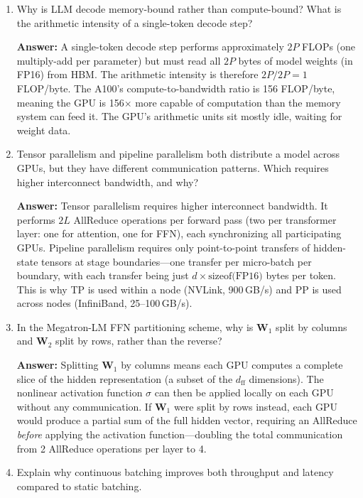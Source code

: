 \begin{enumerate}
  \item Why is LLM decode memory-bound rather than compute-bound? What is the arithmetic intensity of a single-token decode step?

  \textbf{Answer:} A single-token decode step performs approximately $2P$ FLOPs (one multiply-add per parameter) but must read all $2P$ bytes of model weights (in FP16) from HBM. The arithmetic intensity is therefore $2P / 2P = 1$ FLOP/byte. The A100's compute-to-bandwidth ratio is 156 FLOP/byte, meaning the GPU is 156$\times$ more capable of computation than the memory system can feed it. The GPU's arithmetic units sit mostly idle, waiting for weight data.

  \item Tensor parallelism and pipeline parallelism both distribute a model across GPUs, but they have different communication patterns. Which requires higher interconnect bandwidth, and why?

  \textbf{Answer:} Tensor parallelism requires higher interconnect bandwidth. It performs $2L$ AllReduce operations per forward pass (two per transformer layer: one for attention, one for FFN), each synchronizing all participating GPUs. Pipeline parallelism requires only point-to-point transfers of hidden-state tensors at stage boundaries---one transfer per micro-batch per boundary, with each transfer being just $d \times \text{sizeof(FP16)}$ bytes per token. This is why TP is used within a node (NVLink, 900\,GB/s) and PP is used across nodes (InfiniBand, 25--100\,GB/s).

  \item In the Megatron-LM FFN partitioning scheme, why is $\mathbf{W}_1$ split by columns and $\mathbf{W}_2$ split by rows, rather than the reverse?

  \textbf{Answer:} Splitting $\mathbf{W}_1$ by columns means each GPU computes a complete slice of the hidden representation (a subset of the $d_{\text{ff}}$ dimensions). The nonlinear activation function $\sigma$ can then be applied locally on each GPU without any communication. If $\mathbf{W}_1$ were split by rows instead, each GPU would produce a partial sum of the full hidden vector, requiring an AllReduce \emph{before} applying the activation function---doubling the total communication from 2 AllReduce operations per layer to 4.

  \item Explain why continuous batching improves both throughput and latency compared to static batching.


\end{enumerate}
